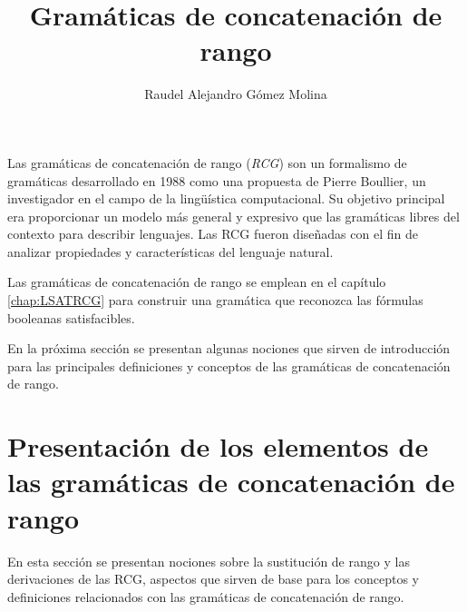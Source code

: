 \documentclass[12pt]{article}
\title{Gramáticas de concatenación de rango}
\author{Raudel Alejandro Gómez Molina}
\begin{document}
\maketitle






Las gramáticas de concatenación de rango (\textit{RCG}) \cite{mainRCGBib} son un formalismo de gramáticas desarrollado en 1988 como una 
propuesta de Pierre Boullier, un investigador en el campo de la lingüística computacional. Su objetivo principal 
era proporcionar un modelo más general y expresivo que las gramáticas libres del contexto para describir lenguajes. 
Las RCG fueron diseñadas con el fin de analizar propiedades y características del lenguaje natural.

Las gramáticas de concatenación de rango se emplean en el capítulo \ref{chap:LSATRCG} para construir una 
gramática que reconozca las fórmulas booleanas satisfacibles.

En la próxima sección se presentan algunas nociones que sirven de introducción para las principales definiciones y conceptos
de las gramáticas de concatenación de rango.

\section{Presentación de los elementos de las gramáticas de concatenación de rango}

En esta sección se presentan nociones sobre la sustitución de rango y las derivaciones de las RCG, aspectos 
que sirven de base para los conceptos y definiciones relacionados con las gramáticas de concatenación de rango.
\end{document}

